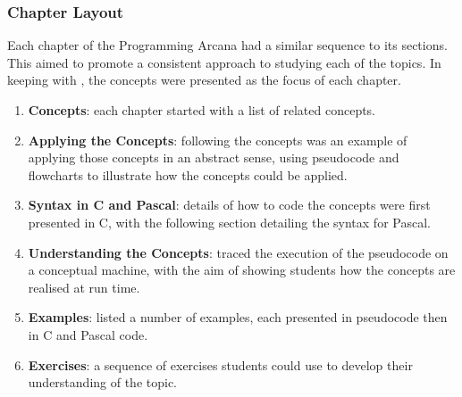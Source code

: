 


\clearpage
\subsubsection{Chapter Layout} %
\label{ssub:chapter_layout}

Each chapter of the Programming Arcana had a similar sequence to its sections. This aimed to promote a consistent approach to studying each of the topics. In keeping with , the concepts were presented as the focus of each chapter. %

\begin{enumerate}
  \item \textbf{Concepts}: each chapter started with a list of related concepts.
  \item \textbf{Applying the Concepts}: following the concepts was an example of applying those concepts in an abstract sense, using pseudocode and flowcharts to illustrate how the concepts could be applied.
  \item \textbf{Syntax in C and Pascal}: details of how to code the concepts were first presented in C, with the following section detailing the syntax for Pascal.
  \item \textbf{Understanding the Concepts}: traced the execution of the pseudocode on a conceptual machine, with the aim of showing students how the concepts are realised at run time. 
  \item \textbf{Examples}: listed a number of examples, each presented in pseudocode then in C and Pascal code.
  \item \textbf{Exercises}: a sequence of exercises students could use to develop their understanding of the topic.
\end{enumerate}


